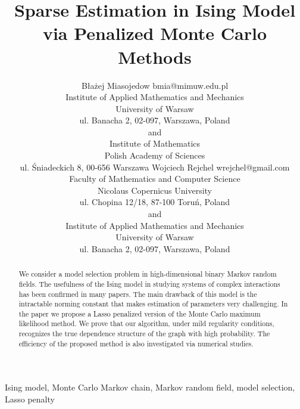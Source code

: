\documentclass[twoside,11pt]{article}
\begin{document}
\title{Sparse Estimation in Ising Model
via Penalized Monte Carlo Methods }

\author{\name B{\l}a{\.z}ej Miasojedow \email bmia@mimuw.edu.pl \\
       \addr Institute of Applied Mathematics and Mechanics\\
       University of Warsaw\\
       ul. Banacha 2, 02-097, Warszawa, Poland\\
       and\\
       Institute of Mathematics\\
       Polish Academy of Sciences\\
       ul. {\'S}niadeckich 8, 00-656 Warszawa
       \AND
       \name Wojciech Rejchel \email  wrejchel@gmail.com\\
       \addr Faculty of Mathematics and Computer Science \\
       Nicolaus Copernicus University\\
       ul. Chopina 12/18,
87-100 Toru{\'n}, Poland\\
and\\
\addr Institute of Applied Mathematics and Mechanics\\
       University of Warsaw\\
       ul. Banacha 2, 02-097, Warszawa, Poland\\}

\maketitle

\begin{abstract}%
We consider a  model selection problem in high-dimensional binary Markov random fields. 
The usefulness of the Ising model in studying systems of complex interactions has been confirmed in many papers. The main drawback of this model is the intractable norming constant that makes estimation of parameters  very challenging. 
In the paper we propose a Lasso penalized version of the Monte Carlo maximum likelihood method.
We prove that our algorithm, under mild regularity conditions,  recognizes the true dependence structure of the graph with high probability. The efficiency of the proposed method is also investigated via numerical studies.
\end{abstract}

\begin{keywords}
  Ising model, Monte Carlo Markov chain, Markov random field, model selection, Lasso penalty 
\end{keywords}
\end{document}
